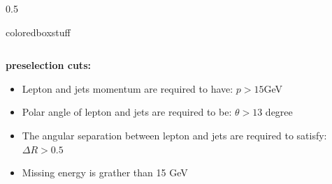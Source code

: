\documentclass[xcolor=dvipsnames,8pt]{beamer}
\begin{document}
\begin{frame}
\begin{columns}
\begin{column}{0.5\textwidth}
\begin{beamercolorbox}[wd=1\textwidth,sep=1em]{coloredboxstuff}
{\begin{tabular}{c|c|c}
					\end{tabular}%
				}
				\end{beamercolorbox}
				{\bf  preselection cuts:}
				\begin{itemize}
				\item Lepton and jets momentum are  required to have: $p>15$GeV
				\item Polar angle of lepton and jets are required to be: $\theta>13$ degree
				\item The angular separation between lepton and jets are required to satisfy: $\Delta R>0.5$
				\item Missing energy  is grather than 15 GeV
				\end{itemize}
				\end{column}
				\end{columns}
				\end{frame}
\end{document}

